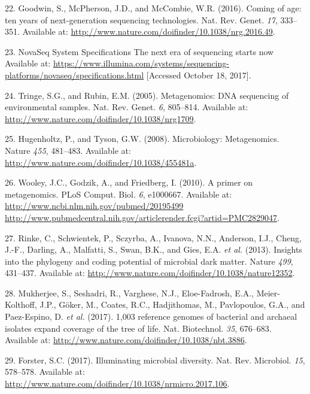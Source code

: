 \documentclass[11pt,a4paper,twoside]{book}
\theoremstyle{definition}
\theoremstyle{definition}
\theoremstyle{remark}
\begin{document}
\hypertarget{ref-Goodwin2016}{}
22. Goodwin, S., McPherson, J.D., and McCombie, W.R. (2016). Coming of
age: ten years of next-generation sequencing technologies. Nat. Rev.
Genet. \emph{17}, 333--351. Available at:
\url{http://www.nature.com/doifinder/10.1038/nrg.2016.49}.

\hypertarget{ref-NovaSeqSystemSpecifications}{}
23. NovaSeq System Specifications \textbar{} The next era of sequencing
starts now Available at:
\url{https://www.illumina.com/systems/sequencing-platforms/novaseq/specifications.html}
{[}Accessed October 18, 2017{]}.

\hypertarget{ref-Tringe2005}{}
24. Tringe, S.G., and Rubin, E.M. (2005). Metagenomics: DNA sequencing
of environmental samples. Nat. Rev. Genet. \emph{6}, 805--814. Available
at: \url{http://www.nature.com/doifinder/10.1038/nrg1709}.

\hypertarget{ref-Hugenholtz2008}{}
25. Hugenholtz, P., and Tyson, G.W. (2008). Microbiology: Metagenomics.
Nature \emph{455}, 481--483. Available at:
\url{http://www.nature.com/doifinder/10.1038/455481a}.

\hypertarget{ref-Wooley2010}{}
26. Wooley, J.C., Godzik, A., and Friedberg, I. (2010). A primer on
metagenomics. PLoS Comput. Biol. \emph{6}, e1000667. Available at:
\href{http://www.ncbi.nlm.nih.gov/pubmed/20195499\%20http://www.pubmedcentral.nih.gov/articlerender.fcgi?artid=PMC2829047}{http://www.ncbi.nlm.nih.gov/pubmed/20195499 http://www.pubmedcentral.nih.gov/articlerender.fcgi?artid=PMC2829047}.

\hypertarget{ref-Rinke2013}{}
27. Rinke, C., Schwientek, P., Sczyrba, A., Ivanova, N.N., Anderson,
I.J., Cheng, J.-F., Darling, A., Malfatti, S., Swan, B.K., and Gies,
E.A. \emph{et al.} (2013). Insights into the phylogeny and coding
potential of microbial dark matter. Nature \emph{499}, 431--437.
Available at: \url{http://www.nature.com/doifinder/10.1038/nature12352}.

\hypertarget{ref-Mukherjee2017}{}
28. Mukherjee, S., Seshadri, R., Varghese, N.J., Eloe-Fadrosh, E.A.,
Meier-Kolthoff, J.P., Göker, M., Coates, R.C., Hadjithomas, M.,
Pavlopoulos, G.A., and Paez-Espino, D. \emph{et al.} (2017). 1,003
reference genomes of bacterial and archaeal isolates expand coverage of
the tree of life. Nat. Biotechnol. \emph{35}, 676--683. Available at:
\url{http://www.nature.com/doifinder/10.1038/nbt.3886}.

\hypertarget{ref-Forster2017}{}
29. Forster, S.C. (2017). Illuminating microbial diversity. Nat. Rev.
Microbiol. \emph{15}, 578--578. Available at:
\url{http://www.nature.com/doifinder/10.1038/nrmicro.2017.106}.
\end{document}
